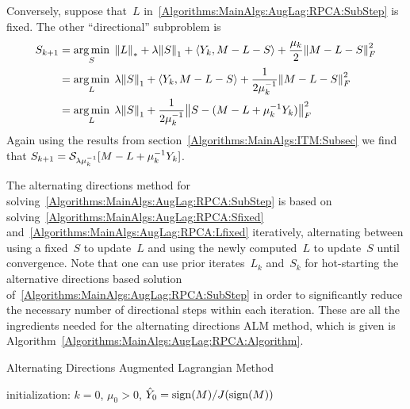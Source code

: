 \documentclass{../../common/projectreport}
\begin{document}
Conversely, suppose that~$L$ in~\eqref{Algorithms:MainAlgs:AugLag:RPCA:SubStep} is fixed. The other ``directional'' subproblem is
%
\begin{align}
\begin{split}
S_{k+1} &= \operatorname*{arg\,min}_{S} \; {\left\|L\right\|}_{*}^{} + \lambda {\left\|S\right\|}_{1}^{} + \langle Y_k, M-L-S \rangle + \frac{\mu_k}{2} {\left\|M-L-S\right\|}_{F}^{2} \\
&= \operatorname*{arg\,min}_{L} \; \lambda {\left\|S\right\|}_{1}^{} + \langle Y_k, M-L-S \rangle + \frac{1}{2\mu_k^{-1}} {\left\|M-L-S\right\|}_{F}^{2} \\
&= \operatorname*{arg\,min}_{L} \; \lambda {\left\|S\right\|}_{1}^{} + \frac{1}{2\mu_k^{-1}} {\left\|S-(M-L+\mu_k^{-1}Y_k)\right\|}_{F}^{2} 
\end{split}
\label{Algorithms:MainAlgs:AugLag:RPCA:Lfixed}
\end{align}
%
Again using the results from section~\ref{Algorithms:MainAlgs:ITM:Subsec} we find that $S_{k+1} = {\mathcal{S}}_{\lambda\mu_k^{-1}}[M-L+\mu_k^{-1}Y_k]$. 

The alternating directions method for solving~\eqref{Algorithms:MainAlgs:AugLag:RPCA:SubStep} is based on solving~\eqref{Algorithms:MainAlgs:AugLag:RPCA:Sfixed} and~\eqref{Algorithms:MainAlgs:AugLag:RPCA:Lfixed} iteratively, alternating between using a fixed~$S$ to update~$L$ and using the newly computed~$L$ to update~$S$ until convergence. Note that one can use prior iterates~$L_k$ and~$S_k$ for hot-starting the alternative directions based solution of~\eqref{Algorithms:MainAlgs:AugLag:RPCA:SubStep} in order to significantly reduce the necessary number of directional steps within each iteration. These are all the ingredients needed for the alternating directions ALM method, which is given is Algorithm~\ref{Algorithms:MainAlgs:AugLag:RPCA:Algorithm}.

\begin{algorithm}
\caption{Alternating Directions Augmented Lagrangian Method}
initialization: $k=0$, $\mu_0>0$, ${\hat{Y}}_0 = \operatorname{sign}(M)/J(\operatorname{sign}(M))$\;
\label{Algorithms:MainAlgs:AugLag:RPCA:Algorithm}
\end{algorithm}
\end{document}
